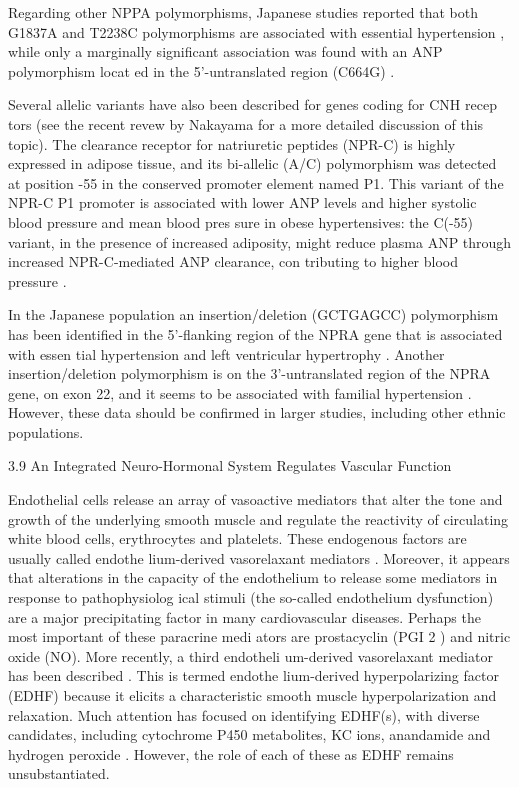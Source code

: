 \documentclass[14pt,a4paper,onecolumn]{extarticle}
\begin{document}
Regarding other NPPA polymorphisms, Japanese studies reported that both G1837A and T2238C polymorphisms are associated with essential hypertension \citep{262}, while only a marginally significant association was found with an ANP polymorphism locat ed in the 5’-untranslated region (C664G) \citep{263}.

Several allelic variants have also been described for genes coding for CNH recep tors (see the recent revew by Nakayama \citep{251} for a more detailed discussion of this topic). The clearance receptor for natriuretic peptides (NPR-C) is highly expressed in adipose tissue, and its bi-allelic (A/C) polymorphism was detected at position -55 in the conserved promoter element named P1. This variant of the NPR-C P1 promoter is associated with lower ANP levels and higher systolic blood pressure and mean blood pres sure in obese hypertensives: the C(-55) variant, in the presence of increased adiposity, might reduce plasma ANP through increased NPR-C-mediated ANP clearance, con tributing to higher blood pressure \citep{264}.

In the Japanese population an insertion/deletion (GCTGAGCC) polymorphism has been identified in the 5’-flanking region of the NPRA gene that is associated with essen tial hypertension and left ventricular hypertrophy \citep{265}. Another insertion/deletion polymorphism is on the 3’-untranslated region of the NPRA gene, on exon 22, and it seems to be associated with familial hypertension \citep{266}. However, these data should be confirmed in larger studies, including other ethnic populations.

3.9 An Integrated Neuro-Hormonal System Regulates Vascular Function

Endothelial cells release an array of vasoactive mediators that alter the tone and growth of the underlying smooth muscle and regulate the reactivity of circulating white blood cells, erythrocytes and platelets. These endogenous factors are usually called endothe lium-derived vasorelaxant mediators \citep{267}. Moreover, it appears that alterations in the capacity of the endothelium to release some mediators in response to pathophysiolog ical stimuli (the so-called endothelium dysfunction) are a major precipitating factor in many cardiovascular diseases. Perhaps the most important of these paracrine medi ators are prostacyclin (PGI 2 ) and nitric oxide (NO). More recently, a third endotheli um-derived vasorelaxant mediator has been described \citep{267}. This is termed endothe lium-derived hyperpolarizing factor (EDHF) because it elicits a characteristic smooth muscle hyperpolarization and relaxation. Much attention has focused on identifying EDHF(s), with diverse candidates, including cytochrome P450 metabolites, KC ions, anandamide and hydrogen peroxide \citep{267}. However, the role of each of these as EDHF remains unsubstantiated.
\end{document}
